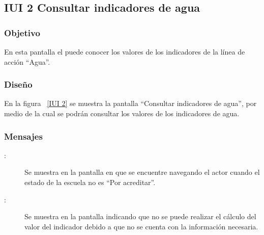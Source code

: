 \subsection{IUI 2 Consultar indicadores de agua}
\subsubsection{Objetivo}
	
	En esta pantalla el  puede conocer los valores de los indicadores
	de la línea de acción ``Agua''.	

\subsubsection{Diseño}

    En la figura ~\ref{IUI 2} se muestra la pantalla ``Consultar indicadores de agua'', por medio de la cual 
    se podrán consultar los valores de los indicadores de agua.


\subsubsection{Mensajes}

	
\begin{description}
	\item[:] Se muestra en la pantalla en que se encuentre navegando el actor cuando el estado de la escuela no es ``Por acreditar''.
	\item[:] Se muestra en la pantalla  indicando que no se puede realizar el cálculo del valor del indicador
				     debido a que no se cuenta con la información necesaria.
\end{description}
